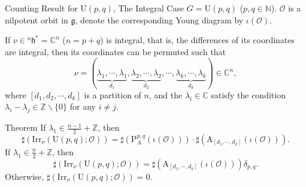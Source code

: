 \documentclass[fleqn,xcolor=dvipsnames]{beamer}
\newcommand{\BC}{{\mathbb {C}}}
\newcommand{\BN}{{\mathbb {N}}}
\newcommand{\BZ}{{\mathbb {Z}}}
\newcommand{\CO}{{\mathcal {O}}}
\newcommand{\fg}{\mathfrak{g}}
\newcommand{\fh}{\mathfrak{h}}
\newcommand{\U}{{\mathrm{U}}}
\newcommand{\Irr}{{\mathrm{Irr}}}
\begin{document}
\begin{frame}{Counting Result for $\U(p,q)$, The Integral Case}
  $G = \U(p,q)$ ($p, q \in \BN$). $\CO$ is a nilpotent orbit in $\fg$, denote the corresponding Young diagram by $\iota(\CO)$.\par
  If $\nu \in {^a\fh^*} = \BC^n$ ($n = p+q$) is integral, that is, the differences of its coordinates are integral, then its coordinates can be permuted such that 
  \[ 
    \nu =  (\underbrace{\lambda_1, \cdots, \lambda_1}_{d_1}, \underbrace{\lambda_2, \cdots, \lambda_2}_{d_2}, \cdots, \underbrace{\lambda_k, \cdots, \lambda_k}_{d_k} ) \in \BC^n, 
  \]
  where $[d_1, d_2, \cdots, d_k]$ is a partition of $n$, and the $\lambda_i \in \BC$ satisfy the condition $\lambda_i - \lambda_j \in \BZ \backslash \{0\}$ for any $i \neq j$.
 
\end{frame}





\begin{frame}
   \begin{block}{Theorem}
        If $\lambda_1 \in \frac{n-1}{2} + \BZ$, then
        \begin{equation*}
            \sharp(\Irr_{\nu}(\U(p,q);\CO)) = \sharp\left(\mathrm{P}_{A}^{p,q}(\iota(\CO))\right) \cdot \sharp\left(\mathrm{A}_{[d_1,\cdots,d_k]}(\iota(\CO))\right).
        \end{equation*}
        If $\lambda_1 \in \frac{n}{2} + \BZ$, then
        \begin{equation*}
            \sharp(\Irr_{\nu}(\U(p,q);\CO)) = \sharp\left(\mathrm{A}_{[d_1,\cdots,d_k]}(\iota(\CO))\right)\delta_{p,q}.
        \end{equation*}
        Otherwise, $\sharp(\Irr_{\nu}(\U(p,q);\CO)) = 0$.
  \end{block}
\end{frame}
\end{document}
